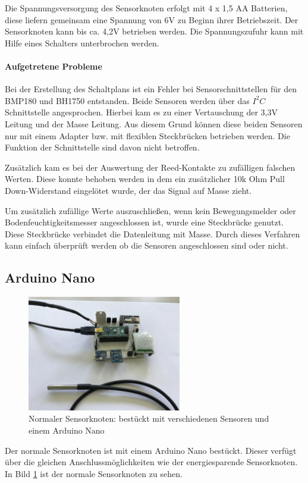 Die Spannungsversorgung des Sensorknoten erfolgt mit 4 x 1,5 AA Batterien, diese liefern gemeinsam eine Spannung von 6V zu Beginn ihrer Betriebszeit. Der Sensorknoten kann bis ca. 4,2V betrieben werden. Die Spannungszufuhr kann mit Hilfe eines Schalters unterbrochen werden. 
\paragraph{Aufgetretene Probleme} Bei der Erstellung des Schaltplans ist ein Fehler bei Sensorschnittstellen für den BMP180 und BH1750 entstanden. Beide Sensoren werden über das $I^2C$ Schnittstelle angesprochen. Hierbei kam es zu einer Vertauschung der 3,3V Leitung und der Masse Leitung. Aus diesem Grund können diese beiden Sensoren nur mit einem Adapter bzw. mit flexiblen Steckbrücken betrieben werden. Die Funktion der Schnittstelle sind davon nicht betroffen. 

Zusätzlich kam es bei der Auswertung der Reed-Kontakte zu zufälligen falschen Werten. Diese konnte behoben werden in dem ein zusätzlicher 10k Ohm Pull Down-Widerstand eingelötet wurde, der das Signal auf Masse zieht.

Um zusätzlich zufällige Werte auszuschließen, wenn kein Bewegungsmelder oder Bodenfeuchtigkeitsmesser angeschlossen ist, wurde eine Steckbrücke genutzt. Diese Steckbrücke verbindet die Datenleitung mit Masse.  Durch dieses Verfahren kann einfach überprüft werden ob die Sensoren angeschlossen sind oder nicht.
\label{sec:ArduinoProMini}
\subsection{Arduino Nano}
\label{sec:ArduinoNano}
\begin{figure}
	\centering
	\includegraphics[width=0.6\textwidth]{bilder/SensorknotenArduinoNano.jpg}
	\caption[Normaler Sensorknoten]{Normaler Sensorknoten: bestückt mit verschiedenen Sensoren und einem Arduino Nano}
	\label{img:ArduinoNano}
\end{figure}
Der normale Sensorknoten ist mit einem Arduino Nano bestückt. Dieser verfügt über die gleichen Anschlussmöglichkeiten wie der energiesparende Sensorknoten. In Bild \ref{img:ArduinoNano} ist der normale Sensorknoten zu sehen.
